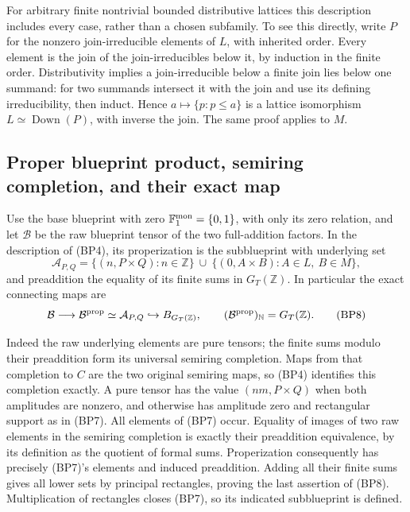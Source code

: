 \documentclass[11pt,a4paper]{article}
\theoremstyle{definition}\newtheorem{definition}[theorem]{Definition}
\begin{document}
For arbitrary finite nontrivial bounded distributive lattices this
description includes every case, rather than a chosen subfamily.
To see this directly, write $P$ for the nonzero join-irreducible
elements of $L$, with inherited order. Every element is the join
of the join-irreducibles below it, by induction in the finite order.
Distributivity implies a join-irreducible below a finite join lies
below one summand: for two summands intersect it with the join and
use its defining irreducibility, then induct. Hence
$a\mapsto\{p:p\le a\}$ is a lattice isomorphism
$L\simeq\operatorname{Down}(P)$, with inverse the join.
The same proof applies to $M$.

\subsection{Proper blueprint product, semiring completion, and their exact map}

Use the base blueprint with zero $\mathbb F_1^{\rm mon}=\{0,1\}$,
with only its zero relation, and let $\mathcal B$ be the raw
blueprint tensor of the two full-addition factors. In the description
of (BP4), its properization is the subblueprint with underlying set
\[
 \mathcal A_{P,Q}
 =\{(n,P\times Q):n\in\mathbb Z\}
       \ \cup\ \{(0,A\times B):A\in L,\ B\in M\},
 \tag{BP7}
\]
and preaddition the equality of its finite sums in $G_T(\mathbb Z)$.
In particular the exact connecting maps are
\[
 \mathcal B\longrightarrow\mathcal B^{\rm prop}
   \simeq\mathcal A_{P,Q}\hookrightarrow B_{G_T(\mathbb Z)},
 \qquad (\mathcal B^{\rm prop})_{\mathbb N}=G_T(\mathbb Z).
 \tag{BP8}
\]

Indeed the raw underlying elements are pure tensors; the finite sums
modulo their preaddition form its universal semiring completion.
Maps from that completion to $C$ are the two original semiring maps,
so (BP4) identifies this completion exactly. A pure tensor has the
value $(nm,P\times Q)$ when both amplitudes are nonzero, and otherwise
has amplitude zero and rectangular support as in (BP7). All elements
of (BP7) occur. Equality of images of two raw elements in the semiring
completion is exactly their preaddition equivalence, by its definition
as the quotient of formal sums. Properization consequently has
precisely (BP7)'s elements and induced preaddition. Adding all their
finite sums gives all lower sets by principal rectangles, proving
the last assertion of (BP8). Multiplication of rectangles closes
(BP7), so its indicated subblueprint is defined.
\end{document}
